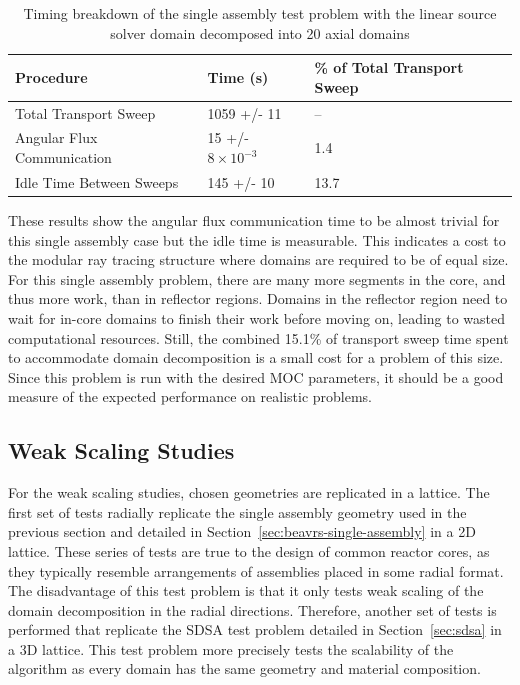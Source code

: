 \begin{table}[ht]
	\centering
	\caption{Timing breakdown of the single assembly test problem with the linear source solver domain decomposed into 20 axial domains}
	\medskip
	\begin{tabular}{l|l|l}
		Procedure & Time (s)  & \% of Total Transport Sweep \\
		\hline
		\hline
		Total Transport Sweep & 1059 +/- 11 & -- \\
		\hline
		Angular Flux Communication & 15 +/- $8 \times 10^{-3}$ & 1.4 \\
		Idle Time Between Sweeps & 145 +/- 10 & 13.7 \\
		\hline
	\end{tabular}
	\label{tab:dd-sa-breakdown}
\end{table}

These results show the angular flux communication time to be almost trivial for this single assembly case but the idle time is measurable. This indicates a cost to the modular ray tracing structure where domains are required to be of equal size. For this single assembly problem, there are many more segments in the core, and thus more work, than in reflector regions. Domains in the reflector region need to wait for in-core domains to finish their work before moving on, leading to wasted computational resources. Still, the combined 15.1\% of transport sweep time spent to accommodate domain decomposition is a small cost for a problem of this size. Since this problem is run with the desired \ac{MOC} parameters, it should be a good measure of the expected performance on realistic problems.

\subsection{Weak Scaling Studies}
\label{sec:dd-weak-scaling}

For the weak scaling studies, chosen geometries are replicated in a lattice. The first set of tests radially replicate the single assembly geometry used in the previous section and detailed in Section~\ref{sec:beavrs-single-assembly} in a 2D lattice. These series of tests are true to the design of common reactor cores, as they typically resemble arrangements of assemblies placed in some radial format. The disadvantage of this test problem is that it only tests weak scaling of the domain decomposition in the radial directions. Therefore, another set of tests is performed that replicate the SDSA test problem detailed in Section~\ref{sec:sdsa} in a 3D lattice. This test problem more precisely tests the scalability of the algorithm as every domain has the same geometry and material composition. 

